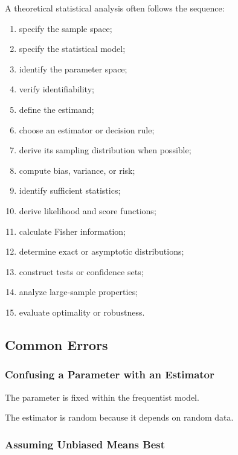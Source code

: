 A theoretical statistical analysis often follows the sequence:

\begin{enumerate}
    \item specify the sample space;
    \item specify the statistical model;
    \item identify the parameter space;
    \item verify identifiability;
    \item define the estimand;
    \item choose an estimator or decision rule;
    \item derive its sampling distribution when possible;
    \item compute bias, variance, or risk;
    \item identify sufficient statistics;
    \item derive likelihood and score functions;
    \item calculate Fisher information;
    \item determine exact or asymptotic distributions;
    \item construct tests or confidence sets;
    \item analyze large-sample properties;
    \item evaluate optimality or robustness.
\end{enumerate}

\subsection{Common Errors}
\label{subsec:mathematical-statistics-common-errors}

\subsubsection{Confusing a Parameter with an Estimator}

The parameter is fixed within the frequentist model.

The estimator is random because it depends on random data.

\subsubsection{Assuming Unbiased Means Best}

